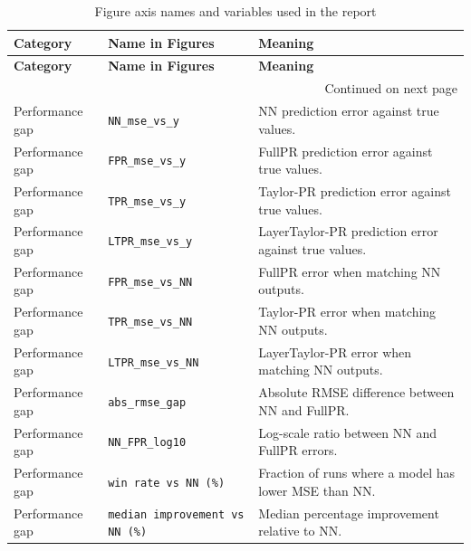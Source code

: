\documentclass[]{interact}
\theoremstyle{plain}
\theoremstyle{definition}
\theoremstyle{remark}
\begin{document}
\begin{longtable}{p{}p{}p{}}
\caption{Figure axis names and variables used in the report}
\label{tab:figure-axis-variables} \\
\toprule
\textbf{Category} & \textbf{Name in Figures} & \textbf{Meaning} \\
\midrule
\endfirsthead

\toprule
\textbf{Category} & \textbf{Name in Figures} & \textbf{Meaning} \\
\midrule
\endhead

\midrule
\multicolumn{3}{r}{Continued on next page} \\
\midrule
\endfoot

\bottomrule
\endlastfoot

Performance gap
& \texttt{NN\_mse\_vs\_y}
& NN prediction error against true values. \\

Performance gap
& \texttt{FPR\_mse\_vs\_y}
& FullPR prediction error against true values. \\

Performance gap
& \texttt{TPR\_mse\_vs\_y}
& Taylor-PR prediction error against true values. \\

Performance gap
& \texttt{LTPR\_mse\_vs\_y}
& LayerTaylor-PR prediction error against true values. \\

Performance gap
& \texttt{FPR\_mse\_vs\_NN}
& FullPR error when matching NN outputs. \\

Performance gap
& \texttt{TPR\_mse\_vs\_NN}
& Taylor-PR error when matching NN outputs. \\

Performance gap
& \texttt{LTPR\_mse\_vs\_NN}
& LayerTaylor-PR error when matching NN outputs. \\

Performance gap
& \texttt{abs\_rmse\_gap}
& Absolute RMSE difference between NN and FullPR. \\

Performance gap
& \texttt{NN\_FPR\_log10}
& Log-scale ratio between NN and FullPR errors. \\

Performance gap
& \texttt{win rate vs NN (\%)}
& Fraction of runs where a model has lower MSE than NN. \\

Performance gap
& \texttt{median improvement vs NN (\%)}
& Median percentage improvement relative to NN. \\


\end{longtable}
\end{document}
